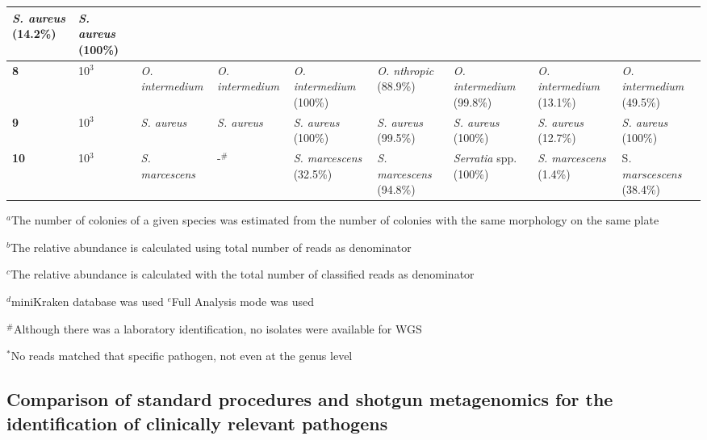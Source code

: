 \begin{table}[]
{\begin{tabular}{@{}|l|l|l|l|lllll|@{}}
  \multicolumn{1}{l|}{\textit{S. aureus} (14.2\%)} &
  \textit{S. aureus} (100\%) \\ \midrule
\textbf{8} &
  10$^3$ &
  \textit{O. intermedium} &
  \textit{O. intermedium} &
  \multicolumn{1}{l|}{\textit{O. intermedium} (100\%)} &
  \multicolumn{1}{l|}{\textit{O. nthropic} (88.9\%)} &
  \multicolumn{1}{l|}{\textit{O. intermedium} (99.8\%)} &
  \multicolumn{1}{l|}{\textit{O. intermedium} (13.1\%)} &
  \textit{O. intermedium} (49.5\%) \\ \midrule
\textbf{9} &
  10$^3$ &
  \textit{S. aureus} &
  \textit{S. aureus} &
  \multicolumn{1}{l|}{\textit{S. aureus} (100\%)} &
  \multicolumn{1}{l|}{\textit{S. aureus} (99.5\%)} &
  \multicolumn{1}{l|}{\textit{S. aureus} (100\%)} &
  \multicolumn{1}{l|}{\textit{S. aureus} (12.7\%)} &
  \textit{S. aureus} (100\%) \\ \midrule
\textbf{10} &
  10$^3$ &
  \textit{S. marcescens} &
  -$^\#$ &
  \multicolumn{1}{l|}{\textit{S. marcescens} (32.5\%)} &
  \multicolumn{1}{l|}{\textit{S. marcescens} (94.8\%)} &
  \multicolumn{1}{l|}{\textit{Serratia} spp. (100\%)} &
  \multicolumn{1}{l|}{\textit{S. marcescens} (1.4\%)} &
  S\textit{. marscescens} (38.4\%) \\ \bottomrule
\end{tabular}%
}
\tiny
\item $^a$The number of colonies of a given species was estimated from the number of colonies with the same morphology on the same plate 
\item $^b$The relative abundance is calculated using total number of reads as denominator
\item $^c$The relative abundance is calculated with the total number of classified reads as denominator
\item $^d$miniKraken database was used
\itel $^e$Full Analysis mode was used 
\item $^\#$Although there was a laboratory identification, no isolates were available for WGS
\item $^*$No reads matched that specific pathogen, not even at the genus level
\end{table}

\subsection{Comparison of standard procedures and shotgun metagenomics for the identification of clinically relevant pathogens}

